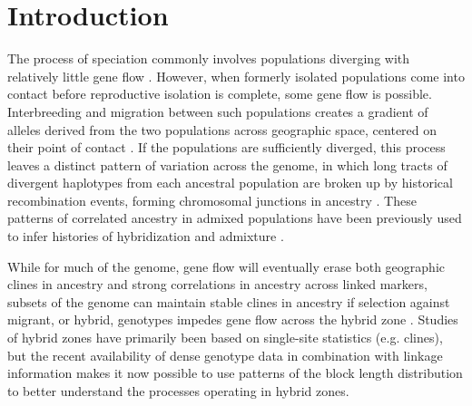 \documentclass[11pt,letterpaper]{article}
\begin{document}
\linenumbers
\doublespacing


\section*{Introduction}


The process of speciation commonly involves populations diverging with relatively little gene flow \citep{Coyne2004}.  
However, when formerly isolated populations come into contact before reproductive isolation is complete, some gene flow is possible.
Interbreeding and migration between such populations  
creates a gradient of alleles derived from the two populations across geographic space, %
centered on their point of contact \citep[reviewed in][]{Barton1985}. 
If the populations are sufficiently diverged, 
this process leaves a distinct pattern of variation across the genome, 
in which long tracts of divergent haplotypes from each ancestral population  
are broken up by historical recombination events,
forming chromosomal {junctions} in ancestry \citep{Fisher1954, Chapman2002, baird2003distribution}. 
These
patterns of correlated ancestry in admixed populations have been previously used to infer histories of hybridization and admixture \citep[e.g.][]{Gravel2012,Hellenthal2014,sedghifar2015spatial}.  


While for much of the genome, gene flow will eventually erase 
both geographic clines in ancestry and strong correlations in ancestry across linked markers, 
subsets of the genome can maintain stable clines in ancestry if selection against migrant, or hybrid, genotypes impedes gene flow across the hybrid zone \citep{barton1979gene}. 
Studies of hybrid zones have primarily been based on single-site statistics (e.g. clines),
but the recent availability of dense genotype data in combination with linkage information 
makes it now possible to use patterns of the block length distribution
to better understand the processes operating in hybrid zones.
\end{document}
